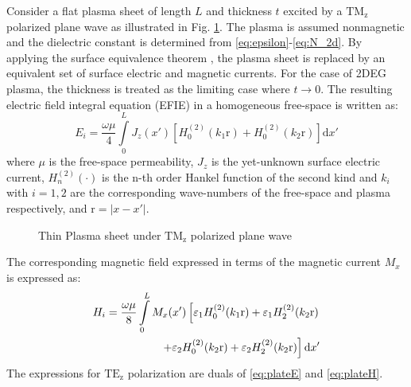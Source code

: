 \documentclass[conference, 10pt]{IEEEtran}
\renewcommand{\O}{\omega}  %
\newcommand{\E}{\varepsilon}  %
\renewcommand{\u}{\mu}  %
\renewcommand{\^}{\hat}  %
\begin{document}
Consider a flat plasma sheet of length $L$ and thickness $t$ excited by a $\mathrm{TM_z}$ polarized plane wave as illustrated in Fig. \ref{fig:plate}. The plasma is assumed nonmagnetic and the dielectric constant is determined from \eqref{eq:epsilon}-\eqref{eq:N_2d}. By applying the surface equivalence theorem \cite[p. 328-333]{balanis2012advanced}, the plasma sheet is replaced by an equivalent set of surface electric and magnetic currents. For the case of 2DEG plasma, the thickness is treated as the limiting case where $t \to 0$. The resulting electric field integral equation (EFIE) in a homogeneous free-space is written as:
%
\begin{equation}
  E_i = \frac{\O \u}{4} \int \limits_{0}^{L} J_z(x') \left[ H_0^{(2)}(k_1 \mathrm r) + H_0^{(2)}(k_2 \mathrm r)\right] \mathrm{d}x'
  \label{eq:plateE}
\end{equation}
%
where $\mu$ is the free-space permeability, $J_z$ is the yet-unknown surface electric current, $H_n^{(2)}(\cdot)$ is the n-th order Hankel function of the second kind and $k_i$ with $i = 1,2$ are the corresponding wave-numbers of the free-space and plasma respectively, and $\mathrm r = |x - x'|$.
%
\begin{figure}[h]
  \normalsize
  \centering
  
  \caption{Thin Plasma sheet under $\mathrm{TM_z}$ polarized plane wave}
  \label{fig:plate}
\end{figure}
%
The corresponding magnetic field expressed in terms of the magnetic current $M_x$ is expressed as:
\begin{align}
  H_i = \frac{\O \u}{8}\int \limits_{0}^{L}  M_x(x')\left[ \E_1 H_0^{(2)}(k_1 \mathrm r) + \E_1 H_2^{(2)}(k_2 \mathrm r) \right.\notag\\
  \left. + \E_2 H_0^{(2)}(k_2 \mathrm r) + \E_2 H_2^{(2)}(k_2 \mathrm r) \right]\mathrm{d}x'
  \label{eq:plateH}
\end{align}
The expressions for $\mathrm{TE_z}$ polarization are duals of \eqref{eq:plateE} and \eqref{eq:plateH}.
\end{document}
